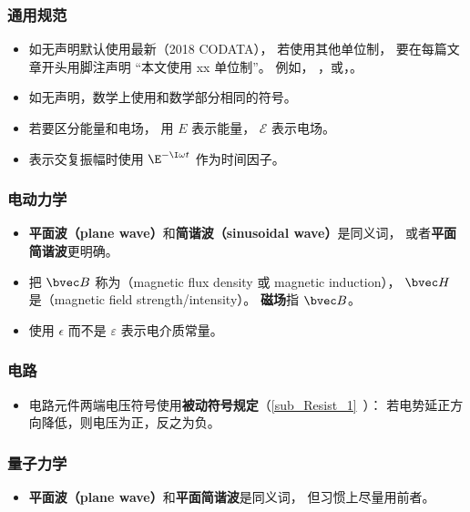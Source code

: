 \subsubsection{通用规范}
\begin{itemize}
\item 如无声明默认使用最新（2018 CODATA）， 若使用其他单位制， 要在每篇文章开头用脚注声明 “本文使用 xx 单位制”。 例如， ，或，。
\item 如无声明，数学上使用和数学部分相同的符号。
\item 若要区分能量和电场， 用 $E$ 表示能量， $\mathcal E$ 表示电场。
\item 表示交复振幅时使用 $\E^{-\I \omega t}$ 作为时间因子。
\end{itemize}

\subsubsection{电动力学}
\begin{itemize}
\item \textbf{平面波（plane wave）}和\textbf{简谐波（sinusoidal wave）}是同义词， 或者\textbf{平面简谐波}更明确。
\item 把 $\bvec B$ 称为（magnetic flux density 或 magnetic induction）， $\bvec H$ 是（magnetic field strength/intensity）。 \textbf{磁场}指 $\bvec B$。
\item 使用 $\epsilon$ 而不是 $\varepsilon$ 表示电介质常量。
\end{itemize}

\subsubsection{电路}
\begin{itemize}
\item 电路元件两端电压符号使用\textbf{被动符号规定}（\autoref{sub_Resist_1}~）： 若电势延正方向降低，则电压为正，反之为负。
\end{itemize}

\subsubsection{量子力学}
\begin{itemize}
\item \textbf{平面波（plane wave）}和\textbf{平面简谐波}是同义词， 但习惯上尽量用前者。
\end{itemize}

